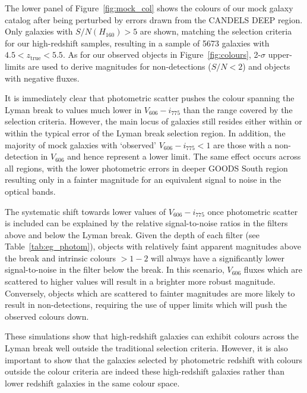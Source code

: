 The lower panel of Figure~\ref{fig:mock_col} shows the colours of our mock galaxy catalog after being perturbed by errors drawn from the CANDELS DEEP region. Only galaxies with $S/N(H_{160}) > 5$ are shown, matching the selection criteria for our high-redshift samples, resulting in a sample of 5673 galaxies with $4.5 < z_{\text{true}} < 5.5$. As for our observed objects in Figure~\ref{fig:colours}, 2-$\sigma$ upper-limits are used to derive magnitudes for non-detections ($S/N < 2$) and objects with negative fluxes.  

It is immediately clear that photometric scatter pushes the colour spanning the Lyman break to values much lower in $V_{606} - i_{775}$ than the range covered by the selection criteria. However, the main locus of galaxies still resides either within or within the typical error of the Lyman break selection region. In addition, the majority of mock galaxies with `observed' $V_{606} - i_{775} < 1$ are those with a non-detection in $V_{606}$ and hence represent a lower limit. The same effect occurs across all regions, with the lower photometric errors in deeper GOODS South region resulting only in a fainter magnitude for an equivalent signal to noise in the optical bands. 

The systematic shift towards lower values of $V_{606} - i_{775}$ once photometric scatter is included can be explained by the relative signal-to-noise ratios in the filters above and below the Lyman break. Given the depth of each filter (see Table~\ref{tab:eg_photom}), objects with relatively faint apparent magnitudes above the break and intrinsic colours $> 1-2$ will always have a significantly lower signal-to-noise in the filter below the break. In this scenario, $V_{606}$ fluxes which are scattered to higher values will result in a brighter more robust magnitude. Conversely, objects which are scattered to fainter magnitudes are more likely to result in non-detections, requiring the use of upper limits which will push the observed colours down.

These simulations show that high-redshift galaxies can exhibit colours across the Lyman break well outside the traditional selection criteria. However, it is also important to show that the galaxies selected by photometric redshift with colours outside the colour criteria are indeed these high-redshift galaxies rather than lower redshift galaxies in the same colour space.

